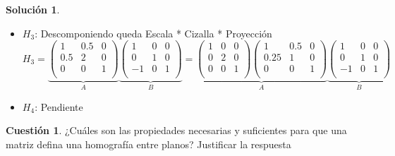 \documentclass[a4paper, 11pt]{article}
\theoremstyle{definition}
\newtheorem{cuestion}{Cuestión}
\newtheorem*{solucion}{Solución}
\begin{document}
\begin{solucion}
\begin{itemize}
        \item $H_3$:
          Descomponiendo queda Escala * Cizalla * Proyección
          \[
          H_3 = \underbrace{
          \left(
          \begin{array}{ccc}
              1 & 0.5 & 0 \\
              0.5 & 2 & 0 \\
              0 & 0 & 1 \\
          \end{array}
          \right)}_{A}
          \underbrace{
          \left(
          \begin{array}{ccc}
              1 & 0 & 0 \\
              0 & 1 & 0 \\
              -1 & 0 & 1 \\
          \end{array}
          \right)}_{B} = \underbrace{\left(
                    \begin{array}{ccc}
                        1 & 0 & 0 \\
                        0 & 2 & 0 \\
                        0 & 0 & 1 \\
                    \end{array}
                    \right)
                    \left(
                    \begin{array}{ccc}
                        1 & 0.5 & 0 \\
                        0.25 & 1 & 0 \\
                        0 & 0 & 1 \\
                    \end{array}
                    \right)}_{A}
                    \underbrace{
                    \left(
                    \begin{array}{ccc}
                        1 & 0 & 0 \\
                        0 & 1 & 0 \\
                        -1 & 0 & 1 \\
                    \end{array}
                    \right)}_{B}
          \]

        \item $H_4$: Pendiente
      \end{itemize}
  \end{solucion}

  \begin{cuestion}
    ¿Cuáles son las propiedades necesarias y suficientes para que una matriz
    defina una homografía entre planos? Justificar la respuesta
  \end{cuestion}
\end{document}

